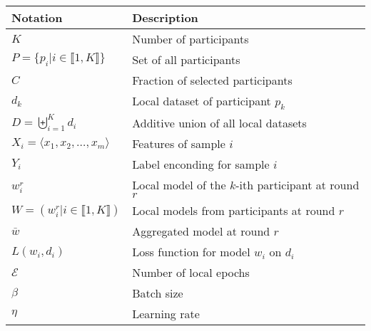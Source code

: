 
\begin{tabular}{ll}
  \toprule %
  \textbf{Notation}                                                   & \textbf{Description} \\
  \midrule %
  $K$                                                                 & Number of participants \\
  $P = \lbrace p_i | i \in \llbracket 1,K \rrbracket \rbrace$         & Set of all participants \\
  $C$                                                                 & Fraction of selected participants \\
  $d_k$                                                               & Local dataset of participant $p_k$ \\
  $D = \biguplus_{i=1}^K d_i$                                         & Additive union of all local datasets \\
  $X_i = \langle x_1, x_2, \dots, x_m \rangle$                        & Features of sample $i$ \\
  $Y_i$                                                               & Label enconding for sample $i$ \\
  $w_i^r$                                                             & Local model of the $k$-ith participant at round $r$ \\
  $W = (w_i^r | i \in \llbracket 1,K \rrbracket)$                     & Local models from participants at round $r$ \\
  $\bar{w}$                                                           & Aggregated model at round $r$ \\
  $L(w_i, d_i)$                                                       & Loss function for model $w_i$ on $d_i$ \\
  $\mathcal{E}$                                                       & Number of local epochs \\
  $\beta$                                                             & Batch size \\
  $\eta$                                                              & Learning rate \\
  \bottomrule %
\end{tabular}